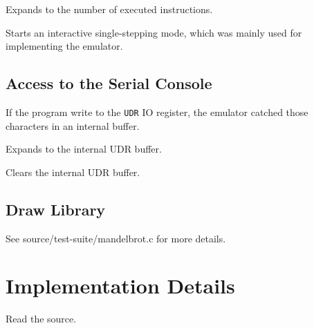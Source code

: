 \documentclass{article}
\begin{document}
\DescribeMacro{\avrinstrcount}
Expands to the number of executed instructions.

\DescribeMacro{\avrsinglestep}
Starts an interactive single-stepping mode, which was mainly used for implementing the emulator.


\subsection{Access to the Serial Console}
If the program write to the \verb|UDR| IO register, the emulator catched those characters in an
internal buffer.

\DescribeMacro{\avrUDR}
Expands to the internal UDR buffer.

\DescribeMacro{\avrUDRclear}
Clears the internal UDR buffer.

\subsection{Draw Library}

See source/test-suite/mandelbrot.c for more details.

\section{Implementation Details}
Read the source.
\end{document}
